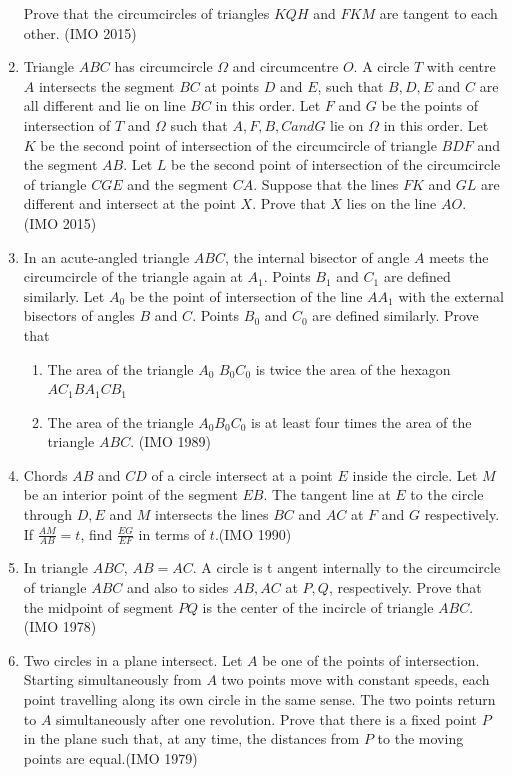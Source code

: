 \begin{enumerate}[label=\thesubsection.\arabic*,ref=\thesubsection.\theenumi]
	Prove that the circumcircles of triangles $KQH$ and $FKM$ are tangent to each other. \hfill(IMO 2015)
\item  Triangle $ABC$ has circumcircle $\Omega$ and circumcentre $O$. A circle $T$ with centre $A$ intersects the segment $BC$ at points $D$ and $E$, such that $B, D, E $ and $C$ are all different and lie on line $BC$ in this order. Let $F$ and $G$ be the points of intersection of $T$ and $\Omega$ such that $A, F, B, C and G$ lie on $\Omega$ in this order. Let $K $ be the second point of intersection of the circumcircle of triangle $BDF$ and the segment $AB$. Let $L$ be the second point of intersection of the circumcircle of triangle $CGE$ and the segment $CA$.
	Suppose that the lines $FK$ and $GL$ are different and intersect at the point $X$. Prove that $X$ lies on the line $AO$. \hfill(IMO  2015)
\item In an acute-angled triangle $ABC$, the internal bisector of angle $A$ meets the circumcircle of the triangle again at $A_1$. Points $B_1$ and $C_1$ are defined similarly. Let $A_0$ be the point of intersection of the line $AA_1$ with the external bisectors of angles $B$ and $C$. Points $B_0$ and $C_0$ are defined similarly. Prove that
\begin{enumerate}
\item The area of the triangle $A_0$ $B_0C_0$ is twice the area of the hexagon $AC_1BA_1CB_1$
\item  The area of the triangle $A_0B_0C_0$ is at least four times the area of the triangle $ABC$. \hfill(IMO  1989)
\end{enumerate}
   \item Chords $AB$ and $CD$ of a circle intersect at a point $E$ inside the circle. Let $M$ be an interior point of the segment $EB$. The tangent line at $E$ to the circle through $D, E$ and $M$ intersects the lines $BC$ and $AC$ at $F$ and $G$ respectively. If $\frac{AM}{AB}=t$,
  find $ \frac{EG}{EF}$  
	  in terms of $t$.\hfill(IMO  1990)
\item In triangle $ABC$, $AB = AC$. A circle is t angent internally to the circumcircle of triangle $ABC$ and also to sides $AB, AC$ at $P, Q$, respectively. Prove that the midpoint of segment $PQ$ is the center of the incircle of triangle $ABC.$\hfill(IMO  1978)
\item Two circles in a plane intersect. Let $A$ be one of the points of intersection. Starting simultaneously from $A$ two points move with constant speeds, each point travelling along its own circle in the same sense. The two points return to $A$ simultaneously after one revolution. Prove that there is a fixed point $P$ in the plane such that, at any time, the distances from $P$ to the moving points are equal.\hfill(IMO  1979) 

\end{enumerate}

